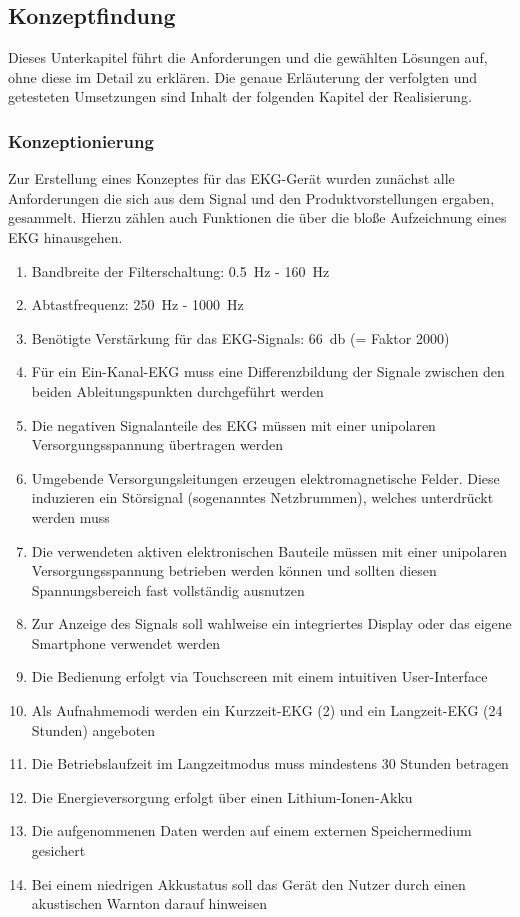 
\subsection{Konzeptfindung}

Dieses Unterkapitel führt die Anforderungen und die gewählten Lösungen auf, ohne diese im Detail zu erklären. Die genaue Erläuterung der verfolgten und getesteten Umsetzungen sind Inhalt der folgenden Kapitel der Realisierung. 

\subsubsection{Konzeptionierung}

Zur Erstellung eines Konzeptes für das EKG-Gerät wurden zunächst alle Anforderungen die sich aus dem Signal und den Produktvorstellungen ergaben, gesammelt. Hierzu zählen auch Funktionen die über die bloße Aufzeichnung eines EKG hinausgehen.

\begin{enumerate}
\item Bandbreite der Filterschaltung: \SI{0.5}{\hertz} - \SI{160}{\hertz}
\item Abtastfrequenz: \SI{250}{\hertz} - \SI{1000}{\hertz}
\item Benötigte Verstärkung für das EKG-Signals: \SI{66}{\decibel} (= Faktor 2000)
\item Für ein Ein-Kanal-EKG muss eine Differenzbildung der Signale zwischen den beiden Ableitungspunkten durchgeführt werden
\item Die negativen Signalanteile des EKG müssen mit einer unipolaren Versorgungsspannung übertragen werden
\item Umgebende Versorgungsleitungen erzeugen elektromagnetische Felder. Diese induzieren ein Störsignal (sogenanntes Netzbrummen), welches unterdrückt werden muss
\item Die verwendeten aktiven elektronischen Bauteile müssen mit einer unipolaren Versorgungsspannung betrieben werden können und sollten diesen Spannungsbereich fast vollständig ausnutzen
\item Zur Anzeige des Signals soll wahlweise ein integriertes Display oder das eigene Smartphone verwendet werden
\item Die Bedienung erfolgt via Touchscreen mit einem intuitiven User-Interface
\item Als Aufnahmemodi werden ein Kurzzeit-EKG (\SI{2}{\min}) und ein Langzeit-EKG (24 Stunden) angeboten
\item Die Betriebslaufzeit im Langzeitmodus muss mindestens 30 Stunden betragen
\item Die Energieversorgung erfolgt über einen Lithium-Ionen-Akku
\item Die aufgenommenen Daten werden auf einem externen Speichermedium gesichert
\item Bei einem niedrigen Akkustatus soll das Gerät den Nutzer durch einen akustischen Warnton darauf hinweisen
\end{enumerate}

